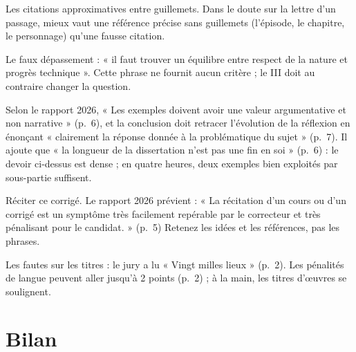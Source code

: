 \documentclass[11pt,a4paper]{article}
\begin{document}
\begin{piege}

Les citations approximatives entre guillemets. Dans le doute sur la lettre d'un passage, mieux vaut une référence précise sans guillemets (l'épisode, le chapitre, le personnage) qu'une fausse citation.

\end{piege}

\begin{piege}

Le faux dépassement : « il faut trouver un équilibre entre respect de la nature et progrès technique ». Cette phrase ne fournit aucun critère ; le III doit au contraire changer la question.

\end{piege}

\begin{jury}

Selon le rapport 2026, « Les exemples doivent avoir une valeur argumentative et non narrative » (p.~6), et la conclusion doit retracer l'évolution de la réflexion en énonçant « clairement la réponse donnée à la problématique du sujet » (p.~7). Il ajoute que « la longueur de la dissertation n'est pas une fin en soi » (p.~6) : le devoir ci-dessus est dense ; en quatre heures, deux exemples bien exploités par sous-partie suffisent.

\end{jury}

\begin{piege}

Réciter ce corrigé. Le rapport 2026 prévient : « La récitation d'un cours ou d'un corrigé est un symptôme très facilement repérable par le correcteur et très pénalisant pour le candidat. » (p.~5) Retenez les idées et les références, pas les phrases.

\end{piege}

\begin{piege}

Les fautes sur les titres : le jury a lu « Vingt milles lieux » (p.~2). Les pénalités de langue peuvent aller jusqu'à 2 points (p.~2) ; à la main, les titres d'œuvres se soulignent.

\end{piege}

\hypertarget{bilan}{%
\section{Bilan}\label{bilan}}
\end{document}
